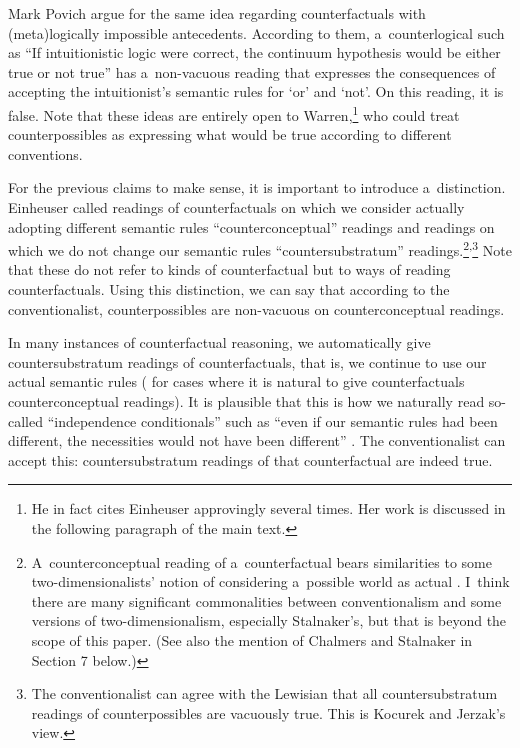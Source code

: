\begin{artengenv}{Mark Povich}
\parencite*[][]{kocurek_counterlogicals_2021} %
 argue for the same idea regarding counterfactuals with (meta)logically impossible antecedents. According to them, a~counterlogical such as ``If intuitionistic logic were correct, the continuum hypothesis would be either true or not true'' has a~non-vacuous reading that expresses the consequences of accepting the intuitionist's semantic rules for ‘or' and ‘not'. On this reading, it is false. Note that these ideas are entirely open to Warren,\footnote{He in fact cites Einheuser approvingly several times. Her work is discussed in the following paragraph of the main text.} who could treat counterpossibles as expressing what would be true according to different conventions.

For the previous claims to make sense, it is important to introduce a~distinction. Einheuser
\parencite*[][]{einheuser_toward_2011} %
 called readings of counterfactuals on which we consider actually adopting different semantic rules ``counterconceptual'' readings and readings on which we do not change our semantic rules ``countersubstratum'' readings.\footnote{A~counterconceptual reading of a~counterfactual bears similarities to some two-dimensionalists' notion of considering a~possible world as actual 
\parencite[][]{stalnaker_considering_2001}. %
 I~think there are many significant commonalities between conventionalism and some versions of two-dimensionalism, especially Stalnaker's, but that is beyond the scope of this paper. (See also the mention of Chalmers and Stalnaker in Section 7 below.)}\textsuperscript{,}\footnote{The conventionalist can agree with the Lewisian that all countersubstratum readings of counterpossibles are vacuously true. This is Kocurek and Jerzak's view.} Note that these do not refer to kinds of counterfactual but to ways of reading counterfactuals. Using this distinction, we can say that according to the conventionalist, counterpossibles are non-vacuous on counterconceptual readings.

In many instances of counterfactual reasoning, we automatically give countersubstratum readings of counterfactuals, that is, we continue to use our actual semantic rules
(\cites[][]{kripke_naming_1980}[][]{wright_defence_1985}[but see][]{kocurek_against_2020} for cases where it is natural to give counterfactuals counterconceptual readings). %
 It is plausible that this is how we naturally read so-called ``independence conditionals'' such as ``even if our semantic rules had been different, the necessities would not have been different'' 
\parencites[][]{thomasson_modal_2007}[see also][]{sidelle_conventionalism_2009}[][]{thomasson_norms_2020}. %
 The conventionalist can accept this: countersubstratum readings of that counterfactual are indeed true.


\end{artengenv}
